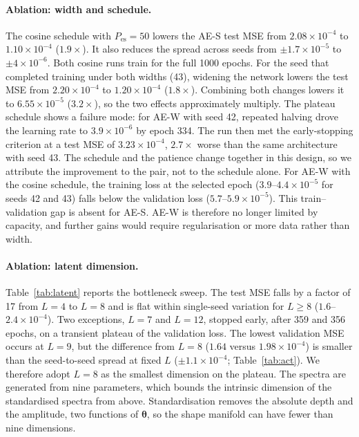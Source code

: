 \paragraph{Ablation: width and schedule.}
The cosine schedule with $P_{\mathrm{es}}=50$ lowers the AE-S test MSE from $2.08\times10^{-4}$ to $1.10\times10^{-4}$ ($1.9\times$).
It also reduces the spread across seeds from $\pm1.7\times10^{-5}$ to $\pm4\times10^{-6}$.
Both cosine runs train for the full 1000 epochs.
For the seed that completed training under both widths (43), widening the network lowers the test MSE from $2.20\times10^{-4}$ to $1.20\times10^{-4}$ ($1.8\times$).
Combining both changes lowers it to $6.55\times10^{-5}$ ($3.2\times$), so the two effects approximately multiply.
The plateau schedule shows a failure mode: for AE-W with seed 42, repeated halving drove the learning rate to $3.9\times10^{-6}$ by epoch 334.
The run then met the early-stopping criterion at a test MSE of $3.23\times10^{-4}$, $2.7\times$ worse than the same architecture with seed 43.
The schedule and the patience change together in this design, so we attribute the improvement to the pair, not to the schedule alone.
For AE-W with the cosine schedule, the training loss at the selected epoch ($3.9$--$4.4\times10^{-5}$ for seeds 42 and 43) falls below the validation loss ($5.7$--$5.9\times10^{-5}$).
This train--validation gap is absent for AE-S.
AE-W is therefore no longer limited by capacity, and further gains would require regularisation or more data rather than width.

\paragraph{Ablation: latent dimension.}
Table~\ref{tab:latent} reports the bottleneck sweep.
The test MSE falls by a factor of 17 from $L=4$ to $L=8$ and is flat within single-seed variation for $L\geq8$ ($1.6$--$2.4\times10^{-4}$).
Two exceptions, $L=7$ and $L=12$, stopped early, after 359 and 356 epochs, on a transient plateau of the validation loss.
The lowest validation MSE occurs at $L=9$, but the difference from $L=8$ ($1.64$ versus $1.98\times10^{-4}$) is smaller than the seed-to-seed spread at fixed $L$ ($\pm1.1\times10^{-4}$; Table~\ref{tab:act}).
We therefore adopt $L=8$ as the smallest dimension on the plateau.
The spectra are generated from nine parameters, which bounds the intrinsic dimension of the standardised spectra from above.
Standardisation removes the absolute depth and the amplitude, two functions of $\bm{\theta}$, so the shape manifold can have fewer than nine dimensions.

